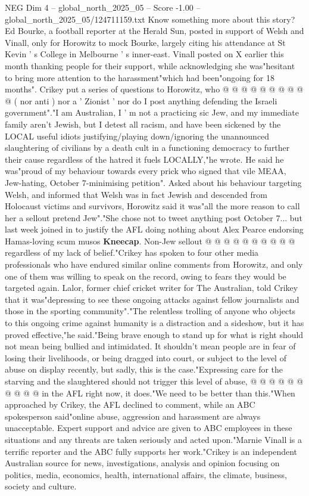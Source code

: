 \begin{textsample}{NEG Dim 4 – global\_north\_2025\_05 – Score -1.00 – global\_north\_2025\_05/124711159.txt}
Know something more about this story?
Ed Bourke, a football reporter at the Herald Sun, posted in support of Welsh and Vinall, only for Horowitz to mock Bourke, largely citing his attendance at St Kevin ' s College in Melbourne ' s inner-east.
Vinall posted on X earlier this month thanking people for their support, while acknowledging she was"hesitant to bring more attention to the harassment"which had been"ongoing for 18 months".
Crikey put a series of questions to Horowitz, who @ @ @ @ @ @ @ @ @ @ ( nor anti ) nor a ' Zionist ' nor do I post anything defending the Israeli government"."I am Australian, I ' m not a practicing sic Jew, and my immediate family aren't Jewish, but I detest all racism, and have been sickened by the LOCAL useful idiots justifying/playing down/ignoring the unannounced slaughtering of civilians by a death cult in a functioning democracy to further their cause regardless of the hatred it fuels LOCALLY,"he wrote.
He said he was"proud of my behaviour towards every prick who signed that vile MEAA, Jew-hating, October 7-minimising petition".
Asked about his behaviour targeting Welsh, and informed that Welsh was in fact Jewish and descended from Holocaust victims and survivors, Horowitz said it was"all the more reason to call her a sellout pretend Jew"."She chose not to tweet anything post October 7... but last week joined in to justify the AFL doing nothing about Alex Pearce endorsing Hamas-loving scum musos \textbf{Kneecap}.
Non-Jew sellout @ @ @ @ @ @ @ @ @ @ regardless of my lack of belief."Crikey has spoken to four other media professionals who have endured similar online comments from Horowitz, and only one of them was willing to speak on the record, owing to fears they would be targeted again.
Lalor, former chief cricket writer for The Australian, told Crikey that it was"depressing to see these ongoing attacks against fellow journalists and those in the sporting community"."The relentless trolling of anyone who objects to this ongoing crime against humanity is a distraction and a sideshow, but it has proved effective,"he said."Being brave enough to stand up for what is right should not mean being bullied and intimidated.
It shouldn't mean people are in fear of losing their livelihoods, or being dragged into court, or subject to the level of abuse on display recently, but sadly, this is the case."Expressing care for the starving and the slaughtered should not trigger this level of abuse, @ @ @ @ @ @ @ @ @ @ in the AFL right now, it does."We need to be better than this."When approached by Crikey, the AFL declined to comment, while an ABC spokesperson said"online abuse, aggression and harassment are always unacceptable.
Expert support and advice are given to ABC employees in these situations and any threats are taken seriously and acted upon."Marnie Vinall is a terrific reporter and the ABC fully supports her work."Crikey is an independent Australian source for news, investigations, analysis and opinion focusing on politics, media, economics, health, international affairs, the climate, business, society and culture.

\end{textsample}
